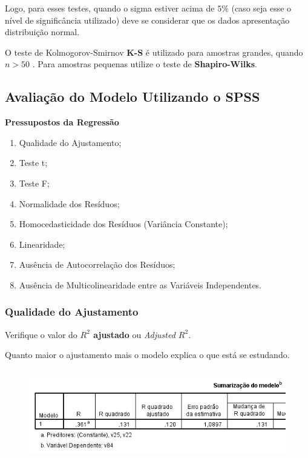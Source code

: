 		Logo, para esses testes, quando o sigma estiver acima de $ 5 \% $ (caso seja esse o nível de significância utilizado) deve se considerar que os dados apresentação distribuição normal.
		
		\bigskip
		
		O teste de Kolmogorov-Smirnov \textbf{K-S} é utilizado para amostras grandes, quando \textbf{$ n > 50 $} . Para amostras pequenas utilize o teste de \textbf{Shapiro-Wilks}. \cite{torres}
	
	\subsection{Avaliação do Modelo Utilizando o SPSS}

		\textbf{Pressupostos da Regressão}

			\begin{enumerate}[label=(\alph*)]
		
				\item Qualidade do Ajustamento;
				\item Teste t;
				\item Teste F;
				\item Normalidade dos Resíduos;
				\item Homocedasticidade dos Resíduos (Variância Constante);
				\item Linearidade;
				\item Ausência de Autocorrelação dos Resíduos;
				\item Ausência de Multicolinearidade entre as Variáveis Independentes. \cite{torres}		
			
			\end{enumerate}

		\subsubsection{Qualidade do Ajustamento}

			Verifique o valor do \textbf{$ R^{2} $ ajustado} ou \emph{Adjusted $ R^{2} $}.
			
			Quanto maior o ajustamento mais o modelo explica o que está se estudando. \cite{torres}

			\begin{figure}[H]
				\centering
				\includegraphics[height=4cm]{images/rl_ajustamento}
			\end{figure}

